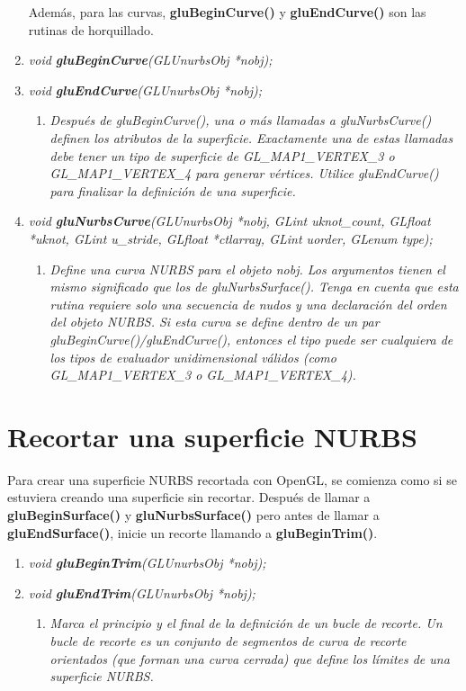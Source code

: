\begin{enumerate}
    Además, para las curvas, \textbf{gluBeginCurve()} y \textbf{gluEndCurve()} son las
    rutinas de horquillado.
    \item[] \emph{void \textbf{gluBeginCurve}(GLUnurbsObj *nobj);}
    \item[] \emph{void \textbf{gluEndCurve}(GLUnurbsObj *nobj);}
    \begin{enumerate}
        \item[] \textit{Después de gluBeginCurve(), una o más llamadas a
            gluNurbsCurve() definen los atributos de la superficie.
            Exactamente una de estas llamadas debe tener un tipo de
            superficie de GL\_MAP1\_VERTEX\_3 o GL\_MAP1\_VERTEX\_4
            para generar vértices. Utilice gluEndCurve() para finalizar
            la definición de una superficie.
        }
    \end{enumerate}
    \item[] \emph{void \textbf{gluNurbsCurve}(GLUnurbsObj *nobj, GLint uknot\_count,
    GLfloat *uknot, GLint u\_stride, GLfloat *ctlarray,
    GLint uorder, GLenum type);}
    \begin{enumerate}
        \item[] \textit{Define una curva NURBS para el objeto nobj.
            Los argumentos tienen el mismo significado que los de gluNurbsSurface().
            Tenga en cuenta que esta rutina requiere solo una secuencia
            de nudos y una declaración del orden del objeto NURBS. Si
            esta curva se define dentro de un par gluBeginCurve()/gluEndCurve(),
            entonces el tipo puede ser cualquiera de los tipos de evaluador
            unidimensional válidos (como GL\_MAP1\_VERTEX\_3 o GL\_MAP1\_VERTEX\_4).
        }
    \end{enumerate}
\end{enumerate}

\section{Recortar una superficie NURBS}

Para crear una superficie NURBS recortada con OpenGL, se comienza como
si se estuviera creando una superficie sin recortar.
Después de llamar a \textbf{gluBeginSurface()} y \textbf{gluNurbsSurface()}
pero antes de llamar a \textbf{gluEndSurface()}, inicie un recorte
llamando a \textbf{gluBeginTrim()}.

\begin{enumerate}
    \item[] \emph{void \textbf{gluBeginTrim}(GLUnurbsObj *nobj);}
    \item[] \emph{void \textbf{gluEndTrim}(GLUnurbsObj *nobj);}
    \begin{enumerate}
        \item[] \textit{Marca el principio y el final de la definición
            de un bucle de recorte. Un bucle de recorte es un conjunto
            de segmentos de curva de recorte orientados (que forman
            una curva cerrada) que define los límites de una superficie NURBS.
        }
    \end{enumerate}
\end{enumerate}

